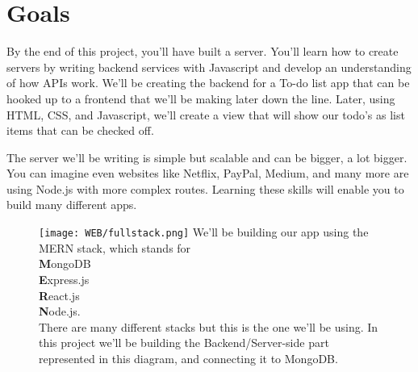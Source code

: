 \documentclass{42-en}
\begin{document}
\chapter{Goals}

    By the end of this project, you’ll have built a server. You’ll learn how to create servers by writing backend services with Javascript and develop an understanding of how APIs work. We’ll be creating the backend for a To-do list app that can be hooked up to a frontend that we’ll be making later down the line. Later, using HTML, CSS, and Javascript, we’ll create a view that will show our todo’s as list items that can be checked off.

The server we’ll be writing is simple but scalable and can be bigger, a lot bigger. You can imagine even websites like Netflix, PayPal, Medium, and many more are using Node.js with more complex routes. Learning these skills will enable you to build many different apps.



    \begin{figure}[H]
        \texttt{[image: WEB/fullstack.png]}
        We'll be building our app using the MERN stack, which stands for \\
        \textbf{M}ongoDB \\
        \textbf{E}xpress.js \\
        \textbf{R}eact.js \\
        \textbf{N}ode.js. \\
        There are many different stacks but this is the one we'll be using.
        In this project we’ll be building the Backend/Server-side part represented in this diagram, and connecting it to MongoDB.
    \end{figure}


\end{document}
